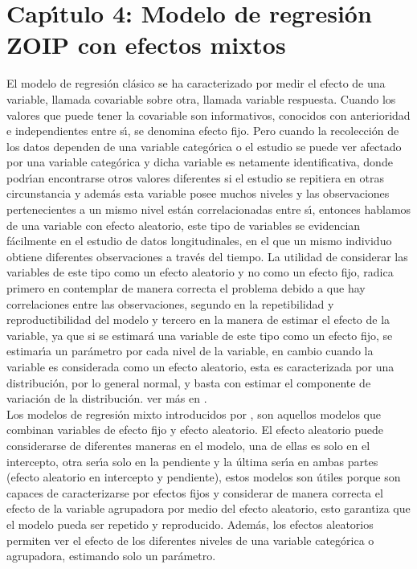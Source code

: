 \chapter{Cap\'{\i}tulo 4: Modelo de regresi\'{o}n ZOIP con efectos mixtos}\label{cap4}

El modelo de regresi\'{o}n cl\'{a}sico se ha caracterizado por medir el efecto de una variable, llamada covariable sobre otra, llamada variable respuesta. Cuando los valores que puede tener la covariable son informativos, conocidos con anterioridad e independientes entre s\'{\i}, se denomina efecto fijo. Pero cuando la recolecci\'{o}n de los datos dependen de una variable categ\'{o}rica o el estudio se puede ver afectado por una variable categ\'{o}rica y dicha variable es netamente identificativa, donde podr\'{\i}an encontrarse otros valores diferentes si el estudio se repitiera en otras circunstancia y adem\'{a}s esta variable posee muchos niveles y las observaciones pertenecientes a un mismo nivel est\'{a}n correlacionadas entre s\'{\i}, entonces hablamos de una variable con efecto aleatorio, este tipo de variables se evidencian f\'{a}cilmente en el estudio de datos longitudinales, en el que un mismo individuo obtiene diferentes observaciones a trav\'{e}s del tiempo. La utilidad de considerar las variables de este tipo como un efecto aleatorio y no como un efecto fijo, radica primero en contemplar de manera correcta el problema debido a que hay correlaciones entre las observaciones, segundo en la repetibilidad y reproductibilidad del modelo y tercero en la manera de estimar el efecto de la variable, ya que si se estimar\'{a} una variable de este tipo como un efecto fijo, se estimar\'{\i}a un par\'{a}metro por cada nivel de la variable, en cambio cuando la variable es considerada como un efecto aleatorio, esta es caracterizada por una distribuci\'{o}n, por lo general normal, y basta con estimar el componente de variaci\'{o}n de la distribuci\'{o}n. ver m\'{a}s en \cite{Seoane1}.\\

Los modelos de regresi\'{o}n mixto introducidos por \cite{Laird1}, son aquellos modelos que combinan variables de efecto fijo y efecto aleatorio. El efecto aleatorio puede considerarse de diferentes maneras en el modelo, una de ellas es solo en el intercepto, otra ser\'{\i}a solo en la pendiente y la \'{u}ltima ser\'{\i}a en ambas partes (efecto aleatorio en intercepto y pendiente), estos modelos son \'{u}tiles porque son capaces de caracterizarse por efectos fijos y considerar de manera correcta el efecto de la variable agrupadora por medio del efecto aleatorio, esto garantiza que el modelo pueda ser repetido y reproducido. Adem\'{a}s, los efectos aleatorios permiten ver el efecto de los diferentes niveles de una variable categ\'{o}rica o agrupadora, estimando solo un par\'{a}metro.\\


